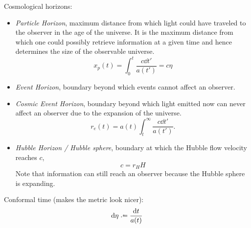 		\noindent
		Cosmological horizons:
		\begin{itemize}
			\item \emph{Particle Horizon}, maximum distance from which light could have traveled to the observer in the age of the universe. It is the maximum distance from which one could possibly retrieve information at a given time and hence determines the size of the observable universe. 
				\begin{equation}
					x_p(t) = \int_{0}^{t} \frac{c \dd{t'}}{a(t')} = c \eta
				\end{equation}
			\item \emph{Event Horizon}, boundary beyond which events cannot affect an observer.
			\item \emph{Cosmic Event Horizon}, boundary beyond which light emitted now can never affect an observer due to the expansion of the universe.
				\begin{equation}
					r_e(t) = a(t) \int^{\infty}_{t} \frac{c \dd{t'}}{a(t')}.
				\end{equation}
			\item \emph{Hubble Horizon / Hubble sphere}, boundary at which the Hubble flow velocity reaches $c$,
				\begin{equation}
					c = r_H H
				\end{equation}
				Note that information can still reach an observer because the Hubble sphere is expanding.
		\end{itemize}

		\noindent
		Conformal time (makes the metric look nicer):
		\begin{equation}
			\dd \eta \defeq \frac{\dd t}{a(t)}
		\end{equation}

